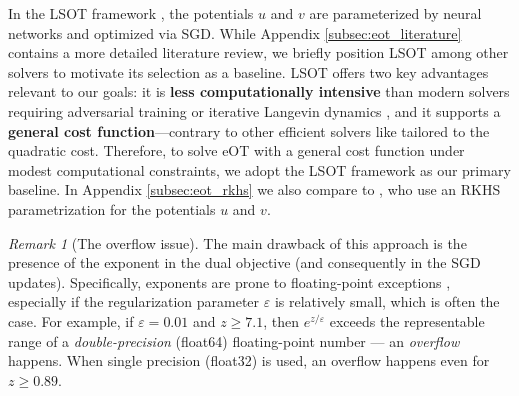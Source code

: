\documentclass{article}
\theoremstyle{plain}
\theoremstyle{definition}
\theoremstyle{remark}
\newtheorem{remark}[theorem]{Remark}
\begin{document}
 {In the LSOT framework \citep{seguy2018large}, the potentials $u$ and $v$ are parameterized by neural networks and optimized via SGD. 
While Appendix \ref{subsec:eot_literature} contains a more detailed literature review, we briefly position LSOT among other solvers to motivate its selection as a baseline.
LSOT offers two key advantages relevant to our goals: it is \textbf{less computationally intensive} than modern solvers requiring adversarial training \citep{korotin2023neural,gushchin2023entropic,asadulaev2024neural} or iterative Langevin dynamics \citep{mokrov2024energyguided}, and it supports a \textbf{general cost function}---contrary to other efficient solvers like \citep{korotin2024light} tailored to the quadratic cost.
Therefore, to solve eOT with a general cost function under modest computational constraints, we adopt the LSOT framework as our primary baseline. In Appendix \ref{subsec:eot_rkhs} we also compare to \citet{genevay2016stochastic}, who use an RKHS parametrization for the potentials $u$ and $v$.}
\begin{remark}
  [The overflow issue]
  The main drawback of this approach is the presence of the exponent in the dual objective (and consequently in the SGD updates).
  Specifically, exponents are prone to floating-point exceptions \citep{goldberg1991every}, especially if the regularization parameter \( \varepsilon \) is relatively small, which is often the case. For example, if \( \varepsilon=0.01 \) and \( z \geq 7.1 \), then \(e^{z/\varepsilon}\) exceeds the representable range of a \textit{double-precision} (float64) floating-point number --- an \textit{overflow} happens. When single precision (float32) is used, an overflow happens even for \(z\geq 0.89\).
  \label{remark:overflow_issue}
\end{remark}
  
\end{document}
